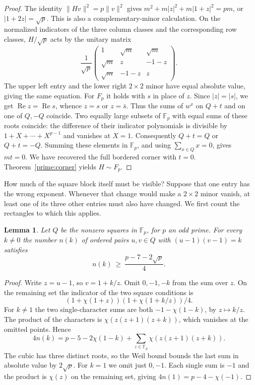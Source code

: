 \documentclass[11pt,a4paper]{article}
\newtheorem{lemma}[theorem]{Lemma}
\numberwithin{equation}{section}
\begin{document}
\begin{proof}
The identity $\|Hv\|^2=p\|v\|^2$ gives $m^2+m|z|^2+m|1+z|^2=pm$, or $|1+2z|=\sqrt p$. This is also a complementary-minor calculation. On the normalized indicators of the three column classes and the corresponding row classes, $H/\sqrt p$ acts by the unitary matrix
$$\frac{1}{\sqrt p}\begin{pmatrix}1&\sqrt m&\sqrt m\\ \sqrt m&z&-1-z\\ \sqrt m&-1-z&z\end{pmatrix}.$$
The upper left entry and the lower right $2\times2$ minor have equal absolute value, giving the same equation. For $F_p$ it holds with $s$ in place of $z$. Since $|z|=|s|$, we get $\operatorname{Re}z=\operatorname{Re}s$, whence $z=s$ or $z=\bar s$. Thus the sums of $w^x$ on $Q+t$ and on one of $Q,-Q$ coincide. Two equally large subsets of $\mathbb F_p$ with equal sums of these roots coincide: the difference of their indicator polynomials is divisible by $1+X+\cdots+X^{p-1}$ and vanishes at $X=1$. Consequently $Q+t=Q$ or $Q+t=-Q$. Summing these elements in $\mathbb F_p$, and using $\sum_{x\in Q}x=0$, gives $mt=0$. We have recovered the full bordered corner with $t=0$. Theorem~\ref{prime:corner} yields $H\sim F_p$.
\end{proof}

\medskip

How much of the square block itself must be visible? Suppose that one entry has the wrong exponent. Whenever that change would make a $2\times2$ minor vanish, at least one of its three other entries must also have changed. We first count the rectangles to which this applies.

\begin{lemma}\label{prime:square-products}
Let $Q$ be the nonzero squares in $\mathbb F_p$, for $p$ an odd prime. For every $k\ne0$ the number $n(k)$ of ordered pairs $u,v\in Q$ with $(u-1)(v-1)=k$ satisfies
$$n(k)\ \ge\ \frac{p-7-2\sqrt p}{4}.$$
\end{lemma}
\begin{proof}
Write $z=u-1$, so $v=1+k/z$. Omit $0,-1,-k$ from the sum over $z$. On the remaining set the indicator of the two square conditions is
$$(1+\chi(1+z))(1+\chi(1+k/z))/4.$$
For $k\ne1$ the two single-character sums are both $-1-\chi(1-k)$, by $z\mapsto k/z$. The product of the characters is $\chi(z(z+1)(z+k))$, which vanishes at the omitted points. Hence
$$4n(k)=p-5-2\chi(1-k)+\sum_{z\in\mathbb F_p}\chi(z(z+1)(z+k)).$$
The cubic has three distinct roots, so the Weil bound \cite[Theorem~5.41]{ln} bounds the last sum in absolute value by $2\sqrt p$. For $k=1$ we omit just $0,-1$. Each single sum is $-1$ and the product is $\chi(z)$ on the remaining set, giving $4n(1)=p-4-\chi(-1)$.
\end{proof}
\end{document}
